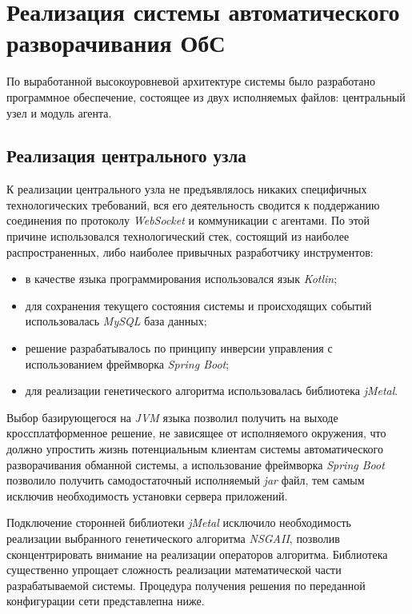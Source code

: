 \section{Реализация системы автоматического разворачивания ОбС}

По выработанной высокоуровневой архитектуре системы было разработано программное обеспечение, состоящее из двух исполняемых файлов: центральный узел и модуль агента.

\subsection{Реализация центрального узла}

К реализации центрального узла не предъявлялось никаких специфичных технологических требований, вся его деятельность сводится к поддержанию соединения по протоколу \textit{WebSocket} и коммуникации с агентами. По этой причине использовался технологический стек, состоящий из наиболее распространенных, либо наиболее привычных разработчику инструментов:
\begin{itemize}
	\item в качестве языка программирования использовался язык \textit{Kotlin};
	\item для сохранения текущего состояния системы и происходящих событий использовалась \textit{MySQL} база данных;
	\item решение разрабатывалось по принципу инверсии управления с использованием фреймворка \textit{Spring Boot};
	\item для реализации генетического алгоритма использовалась библиотека \textit{jMetal}.
\end{itemize}

Выбор базирующегося на \textit{JVM} языка позволил получить на выходе кроссплатформенное решение, не зависящее от исполняемого окружения, что должно упростить жизнь потенциальным клиентам системы автоматического разворачивания обманной системы, а использование фреймворка \textit{Spring Boot} позволило получить самодостаточный исполняемый \textit{jar} файл, тем самым исключив необходимость установки сервера приложений.

Подключение сторонней библиотеки \textit{jMetal} исключило необходимость реализации выбранного генетического алгоритма \textit{NSGAII}, позволив сконцентрировать внимание на реализации операторов алгоритма. Библиотека существенно упрощает сложность реализации математической части разрабатываемой системы. Процедура получения решения по переданной конфигурации сети представлепна ниже.

